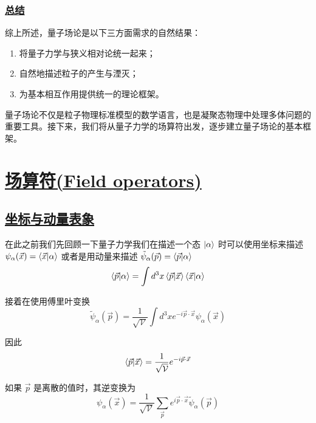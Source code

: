 \subsubsection{\protect\hyperlink{:}{总结}}

综上所述，量子场论是以下三方面需求的自然结果：
\begin{enumerate}
    \item 将量子力学与狭义相对论统一起来；
    \item 自然地描述粒子的产生与湮灭；
    \item 为基本相互作用提供统一的理论框架。
\end{enumerate}

量子场论不仅是粒子物理标准模型的数学语言，也是凝聚态物理中处理多体问题的重要工具。接下来，我们将从量子力学的场算符出发，逐步建立量子场论的基本框架。



\section{\protect\hyperlink{:}{场算符(Field operators)}}

\subsection{\protect\hyperlink{:}{坐标与动量表象}}

在此之前我们先回顾一下量子力学我们在描述一个态 $\ket{\alpha}$ 时可以使用坐标来描述 $\psi_\alpha(\vec{x}) = \braket{\vec{x}}{\alpha}$ 或者是用动量来描述 $\tilde{\psi}_\alpha(\vec{p}) = \braket{\vec{p}}{\alpha}$ 
\begin{equation*}
    \braket{\vec{p}}{\alpha} = \int d^3 x \braket{\vec{p}}{\vec{x}}\braket{\vec{x}}{\alpha}
\end{equation*}

接着在使用傅里叶变换
\begin{equation*}
    \tilde{\psi}_\alpha (\vec{p}) = \frac{1}{\sqrt{\mathcal{V}}} \int d^3 x e^{-i\vec{p}\cdot \vec{x}} \psi_\alpha (\vec{x})
\end{equation*}

因此 
\begin{equation*}
    \braket{\vec{p}}{\vec{x}} = \frac{1}{\sqrt{\mathcal{V}}} e^{-i\vec{p} \cdot \vec{x}}
\end{equation*}

如果 $\vec{p}$ 是离散的值时，其逆变换为
\begin{equation*}
    \psi_\alpha (\vec{x}) = \frac{1}{\sqrt{\mathcal{V}}} \sum_{\vec{p}} e^{i\vec{p}\cdot \vec{x}} \tilde{\psi}_\alpha (\vec{p})
\end{equation*}


